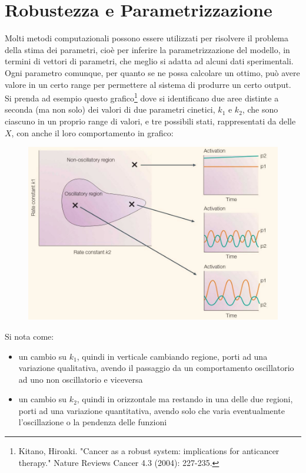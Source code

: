 \documentclass[a4paper,12pt, oneside]{book}
\begin{document}
\section{Robustezza e Parametrizzazione}
Molti metodi computazionali possono essere utilizzati per risolvere il problema
della stima dei parametri, cioè per inferire la parametrizzazione del modello,
in termini di vettori di parametri, che meglio si adatta ad alcuni dati
sperimentali. Ogni parametro comunque, per quanto se ne possa calcolare un
ottimo, può avere valore in un certo range per permettere al sistema di produrre
un certo output. \\
Si prenda ad esempio questo grafico\footnote{Kitano, Hiroaki. "Cancer as a
  robust system: implications for anticancer therapy." Nature Reviews Cancer 4.3
  (2004): 227-235.} dove si identificano due aree distinte a seconda (ma non
solo) dei valori
di due parametri cinetici, $k_1$ e $k_2$, che sono ciascuno in un proprio range
di valori, e tre possibili stati, rappresentati da delle $X$, con anche il loro
comportamento in grafico:
\begin{figure}[H]
  \centering
  \includegraphics[scale = 1.3]{img/rob5.jpg}
\end{figure}
Si nota come:
\begin{itemize}
  \item un cambio su $k_1$, quindi in verticale cambiando regione, porti ad una
  variazione 
  qualitativa, avendo il passaggio da un comportamento oscillatorio ad uno non
  oscillatorio e viceversa
  \item un cambio su $k_2$, quindi in orizzontale ma restando in una delle due
  regioni, porti ad una variazione 
  quantitativa, avendo solo che varia eventualmente l'oscillazione o la pendenza
  delle funzioni
\end{itemize}
\end{document}
